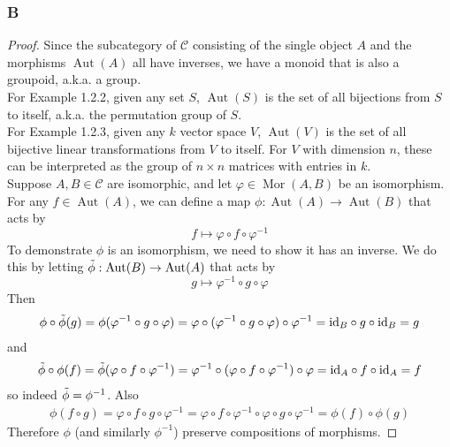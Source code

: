 \documentclass{article}
\newcommand{\id}{\mathrm{id}}
\newcommand{\fC}{\mathscr{C}}
\DeclareMathOperator{\Mor}{\mathrm{Mor}}
\DeclareMathOperator{\Aut}{\mathrm{Aut}}
\begin{document}
\subsubsection{B}\label{1.2.B}
\begin{proof}
    Since the subcategory of $\fC$ consisting of the single object $A$ and the morphisms $\Aut(A)$ all have inverses, we have a monoid that is also a groupoid, a.k.a. a group.\\
    \newline
    For Example 1.2.2, given any set $S$, $\Aut(S)$ is the set of all bijections from $S$ to itself, a.k.a. the permutation group of $S$.\\
    \newline
    For Example 1.2.3, given any $k$ vector space $V$, $\Aut(V)$ is the set of all bijective linear transformations from $V$ to itself. For $V$ with dimension $n$, these can be interpreted as the group of $n\times n$ matrices with entries in $k$.\\
    \newline
    Suppose $A,B\in \mathscr{C}$ are isomorphic, and let $\varphi\in \Mor(A,B)$ be an isomorphism. For any $f\in \Aut(A)$, we can define a map $\phi:\Aut(A)\to \Aut(B)$ that acts by
    \begin{equation*}
        f\mapsto \varphi \circ f \circ \varphi^{-1}
    \end{equation*}
    To demonstrate $\phi$ is an isomorphism, we need to show it has an inverse. We do this by letting $\Tilde{\phi}:\Aut(B)\to \Aut(A)$ that acts by
    \begin{equation*}
        g\mapsto \varphi^{-1}\circ g\circ \varphi
    \end{equation*}
    Then
    \begin{align*}
        \phi \circ \Tilde{\phi}(g)=\phi(\varphi^{-1}\circ g \circ \varphi)=\varphi \circ (\varphi^{-1}\circ g \circ \varphi)\circ \varphi^{-1}=\id_B \circ g \circ \id_B=g
    \end{align*}
    and 
    \begin{align*}
        \Tilde{\phi}\circ \phi(f)=\Tilde{\phi}(\varphi \circ f \circ \varphi^{-1})=\varphi^{-1}\circ (\varphi \circ f \circ \varphi^{-1}) \circ \varphi=\id_A \circ f \circ \id_A=f
    \end{align*}
    so indeed $\Tilde{\phi}=\phi^{-1}$. Also
    \begin{align*}
        \phi(f\circ g)=\varphi \circ f\circ g \circ \varphi^{-1}=\varphi\circ f \circ \varphi^{-1}\circ \varphi \circ g \circ \varphi^{-1}=\phi(f)\circ \phi(g)
    \end{align*}
    Therefore $\phi$ (and similarly $\phi^{-1}$) preserve compositions of morphisms.
\end{proof}
\end{document}
